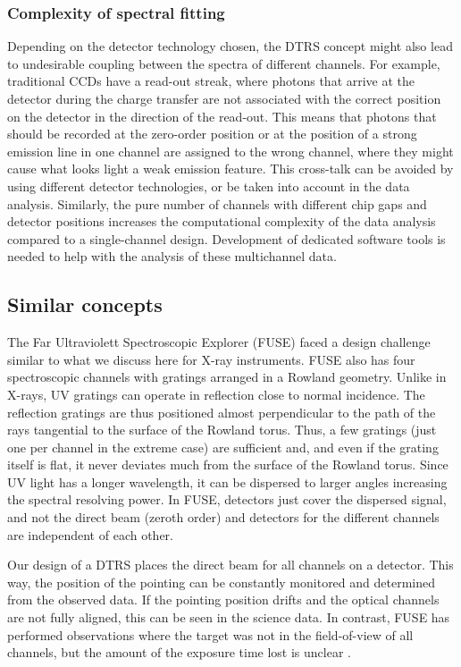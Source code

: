 \documentclass[twocolumn]{aastex631}
\begin{document}
\subsubsection{Complexity of spectral fitting}
Depending on the detector technology chosen, the DTRS concept might also lead to undesirable coupling between the spectra of different channels. For example, traditional CCDs have a read-out streak, where photons that arrive at the detector during the charge transfer are not associated with the correct position on the detector in the direction of the read-out. This means that photons that should be recorded at the zero-order position or at the position of a strong emission line in one channel are assigned to the wrong channel, where they might cause what looks light a weak emission feature. This cross-talk can be avoided by using different detector technologies, or be taken into account in the data analysis. Similarly, the pure number of channels with different chip gaps and detector positions increases the computational complexity of the data analysis compared to a single-channel design. Development of dedicated software tools is needed to help with the analysis of these multichannel data.



\subsection{Similar concepts}

The Far Ultraviolett Spectroscopic Explorer (FUSE) \citep{2000ApJ...538L...1M} faced a design challenge similar to what we discuss here for X-ray instruments. FUSE also has four spectroscopic channels with gratings arranged in a Rowland geometry. Unlike in X-rays, UV gratings can operate in reflection close to normal incidence. The reflection gratings are thus positioned almost perpendicular to the path of the rays tangential to the surface of the Rowland torus. Thus, a few gratings (just one per channel in the extreme case) are sufficient and, and even if the grating itself is flat, it never deviates much from the surface of the Rowland torus. Since UV light has a longer wavelength, it can be dispersed to larger angles increasing the spectral resolving power. In FUSE, detectors just cover the dispersed signal, and not the direct beam (zeroth order) and detectors for the different channels are independent of each other.

Our design of a DTRS places the direct beam for all channels on a detector. This way, the position of the pointing can be constantly monitored and determined from the observed data. If the pointing position drifts and the optical channels are not fully aligned, this can be seen in the science data. In contrast, FUSE has performed observations where the target was not in the field-of-view of all channels, but the amount of the exposure time lost is unclear \citep{2000ApJ...538L...1M}.
\end{document}
